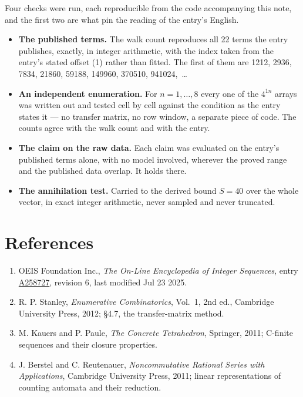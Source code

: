 \documentclass[11pt]{article}
\theoremstyle{definition}
\begin{document}
Four checks were run, each reproducible from the code accompanying this note, and the first two are what pin the reading of the entry's English.

\begin{itemize}

\item {\bfseries The published terms.} The walk count reproduces all 22 terms the entry publishes, exactly, in integer arithmetic, with the index taken from the entry's stated offset (1) rather than fitted. The first of them are 1212, 2936, 7834, 21860, 59188, 149960, 370510, 941024,~\dots

\item {\bfseries An independent enumeration.} For $n = 1,\dots,8$ every one of the $4^{1n}$ arrays was written out and tested cell by cell against the condition as the entry states it --- no transfer matrix, no row window, a separate piece of code. The counts agree with the walk count and with the entry.

\item {\bfseries The claim on the raw data.} Each claim was evaluated on the entry's published terms alone, with no model involved, wherever the proved range and the published data overlap. It holds there.

\item {\bfseries The annihilation test.} Carried to the derived bound $S = 40$ over the whole vector, in exact integer arithmetic, never sampled and never truncated.

\end{itemize}

\section{References}

\begin{enumerate}

\item OEIS Foundation Inc., \emph{The On-Line Encyclopedia of Integer Sequences}, entry \href{https://oeis.org/A258727}{A258727}, revision 6, last modified Jul 23 2025.

\item R. P. Stanley, \emph{Enumerative Combinatorics}, Vol.~1, 2nd ed., Cambridge University Press, 2012; \S4.7, the transfer-matrix method.

\item M. Kauers and P. Paule, \emph{The Concrete Tetrahedron}, Springer, 2011; C-finite sequences and their closure properties.

\item J. Berstel and C. Reutenauer, \emph{Noncommutative Rational Series with Applications}, Cambridge University Press, 2011; linear representations of counting automata and their reduction.

\end{enumerate}
\end{document}

